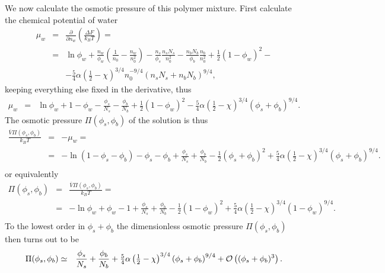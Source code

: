 \documentclass[11pt,a4paper]{article}
\begin{document}
We now calculate the osmotic pressure of this polymer mixture. First calculate the chemical potential of water
\begin{eqnarray}
\mu_w &=& \frac{\partial }{\partial n_w} \left( \frac{\Delta F}{k_B T}\right)  =  \nonumber\\
&=& \ln{\phi_w} +  \frac{n_w}{\phi_w}\left( \frac{1}{n_0} - \frac{n_w}{n_0^2} \right) 
- \frac{n_s}{\phi_s} \frac{n_s N_s}{n_0^2}  - \frac{n_b N_b}{\phi_b} \frac{n_b}{n_0^2} +{\textstyle\frac12}\left( 1 - \phi_w \right)^{2} -  \nonumber\\
& & - {\textstyle\frac{5}{4}} \alpha \left( {\textstyle\frac12} - \chi\right)^{3/4} n_0^{-9/4}\left( n_s N_s + n_b N_b\right)^{9/4},
\end{eqnarray}
keeping everything else fixed in the derivative, thus
\begin{eqnarray}
\mu_w &=&  \ln{\phi_w} + 1 - \phi_w - \frac{\phi_s}{N_s} -\frac{\phi_b}{N_b} +{\textstyle\frac12}\left( 1 - \phi_w \right)^{2} - {\textstyle\frac{5}{4}} \alpha \left( {\textstyle\frac12} - \chi\right)^{3/4} \left( \phi_s + \phi_b\right)^{9/4}.
\end{eqnarray}
The osmotic pressure $\Pi(\phi_s, \phi_b)$ of the solution is thus 
\begin{eqnarray}
\frac{\overline V \Pi(\phi_s, \phi_b)}{k_B T} &=& - \mu_w = \nonumber\\
&=& -  \ln{\left(1 - \phi_s - \phi_b\right)} - \phi_s - \phi_b + \frac{\phi_s}{N_s} + \frac{\phi_b}{N_b} -{\textstyle\frac12}\left(\phi_s + \phi_b \right)^{2} + {\textstyle\frac{5}{4}} \alpha \left( {\textstyle\frac12} - \chi\right)^{3/4} \left( \phi_s + \phi_b\right)^{9/4}. \nonumber\\
~
\end{eqnarray}
or equivalently
\begin{eqnarray}
\Pi(\phi_s, \phi_b) &=& \frac{\overline V \Pi(\phi_s, \phi_b)}{k_B T} = \nonumber\\
&=&-  \ln{\phi_w} + \phi_w -1 + \frac{\phi_s}{N_s} + \frac{\phi_b}{N_b}  - {\textstyle\frac12}\left(1-\phi_w \right)^{2} + {\textstyle\frac{5}{4}} \alpha \left( {\textstyle\frac12} - \chi\right)^{3/4}  \left( 1-\phi_w\right)^{9/4}. \nonumber\\
~
\end{eqnarray}
To the lowest order in $\phi_s + \phi_b$ the dimensionless osmotic pressure  $\Pi(\phi_s, \phi_b)$ then turns out to be
\begin{eqnarray}
\Pi(\phi_s, \phi_b) &\simeq& \frac{\phi_s}{N_s} + \frac{\phi_b}{N_b}  + {\textstyle\frac{5}{4}} \alpha \left( {\textstyle\frac12} - \chi\right)^{3/4} \left( \phi_s + \phi_b\right)^{9/4} + {\cal O}\left( (\phi_s + \phi_b)^{3} \right). 
\label{plothis}
\end{eqnarray}
\end{document}
